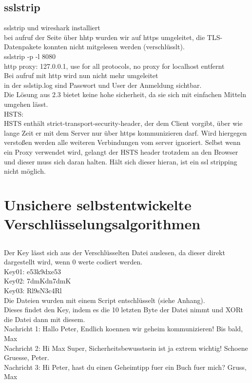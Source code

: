 \documentclass[12pt]{article}
\theoremstyle{plain}
\begin{document}
\subsection{sslstrip}
sslstrip und wireshark installiert\\
bei aufruf der Seite über hhtp wurden wir auf https umgeleitet, die TLS-Datenpakete konnten nicht mitgelesen werden (verschlüsslt).\\
sslstrip -p -l 8080\\
http proxy: 127.0.0.1, use for all protocols, no proxy for localhost entfernt\\
Bei aufruf mit http wird nun nicht mehr umgeleitet\\
in der sslstip.log sind Passwort und User der Anmeldung sichtbar.\\
Die Lösung aus 2.3 bietet keine hohe sicherheit, da sie sich mit einfachen Mitteln umgehen lässt.\\
HSTS:\\
HSTS enthält strict-transport-security-header, der dem Client vorgibt, über wie lange Zeit er mit dem Server nur über https kommunizieren darf. Wird hiergegen verstoßen werden alle weiteren Verbindungen vom server ignoriert. Selbst wenn ein Proxy verwendet wird, gelangt der HSTS header trotzdem an den Browser und dieser muss sich daran halten. Hält sich dieser hieran, ist ein ssl stripping nicht möglich.
\section{Unsichere selbstentwickelte Verschlüsselungsalgorithmen}
\subsection{}
Der Key lässt sich aus der Verschlüsselten Datei auslesen, da dieser direkt dargestellt wird, wenn 0 werte codiert werden.\\
Key01: e53k9dxe53\\
Key02: 7dmKdn7dmK\\
Key03: Rl9sN3c4Rl\\
Die Dateien wurden mit einem Script entschlüsselt (siehe Anhang).\\
Dieses findet den Key, indem es die 10 letzten Byte der Datei nimmt und XORt die Datei dann mit diesem.\\
Nachricht 1: Hallo Peter, Endlich koennen wir geheim kommunizieren! Bis bald, Max\\
Nachricht 2: Hi Max Super, Sicherheitsbewusstsein ist ja extrem wichtig! Schoene Gruesse, Peter.\\
Nachricht 3: Hi Peter, hast du einen Geheimtipp fuer ein Buch fuer mich? Gruss, Max\\
\end{document}
